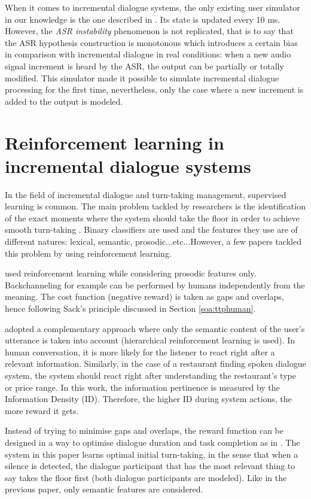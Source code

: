 			When it comes to incremental dialogue systems, the only existing user simulator in our knowledge is the one described in \cite{Selfridge2012b}. Its state is updated every 10 ms. However, the \textit{ASR instability} phenomenon is not replicated, that is to say that the ASR hypothesis construction is monotonous which introduces a certain bias in comparison with incremental dialogue in real conditions: when a new audio signal increment is heard by the ASR, the output can be partially or totally modified. This simulator made it possible to simulate incremental dialogue processing for the first time, nevertheless, only the case where a new increment is added to the output is modeled.
				
\section{Reinforcement learning in incremental dialogue systems}

	In the field of incremental dialogue and turn-taking management, supervised learning is common. The main problem tackled by researchers is the identification of the exact moments where the system should take the floor in order to achieve smooth turn-taking \cite{Raux2008,Gravano2011,Meena2013}. Binary classifiers are used and the features they use are of different natures: lexical, semantic, prosodic...etc...However, a few papers tackled this problem by using reinforcement learning.
        
	\citet{Jonsdottir2008} used reinforcement learning while considering prosodic features only. Backchanneling for example can be performed by humans independently from the meaning. The cost function (negative reward) is taken as gaps and overlaps, hence following Sack's principle discussed in Section \ref{soa:ttphuman}.
	
	\citet{Dethlefs2012} adopted a complementary approach where only the semantic content of the user's utterance is taken into account (hierarchical reinforcement learning is used). In human conversation, it is more likely for the listener to react right after a relevant information. Similarly, in the case of a restaurant finding spoken dialogue system, the system should react right after understanding the restaurant's type or price range. In this work, the information pertinence is measured by the Information Density (ID). Therefore, the higher ID during system actions, the more reward it gets.
	
	Instead of trying to minimise gaps and overlaps, the reward function can be designed in a way to optimise dialogue duration and task completion as in \cite{Selfridge2010}. The system in this paper learns optimal initial turn-taking, in the sense that when a silence is detected, the dialogue participant that has the most relevant thing to say takes the floor first (both dialogue participants are modeled). Like in the previous paper, only semantic features are considered.
	
